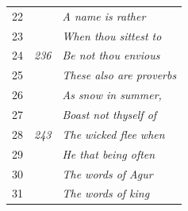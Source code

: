 \documentclass{article}
\newlength{\minipageheight}
\newlength{\minipagewidth}
\begin{document}
\begin{minipage}[r][\minipageheight][t]{\minipagewidth}
\begin{longtable}{ccl}
        22          &              & \textit{A name is rather}                  \\
        23          &              & \textit{When thou sittest to}              \\
        24          & \textit{236} & \textit{Be not thou envious}               \\
        25          &              & \textit{These also are proverbs}           \\
        26          &              & \textit{As snow in summer,}                \\
        27          &              & \textit{Boast not thyself of}              \\
        28          & \textit{243} & \textit{The wicked flee when}              \\
        29          &              & \textit{He that being often}               \\
        30          &              & \textit{The words of Agur}                 \\
        31          &              & \textit{The words of king}                 \\
    \end{longtable}
\end{minipage}%
%
\end{document}
